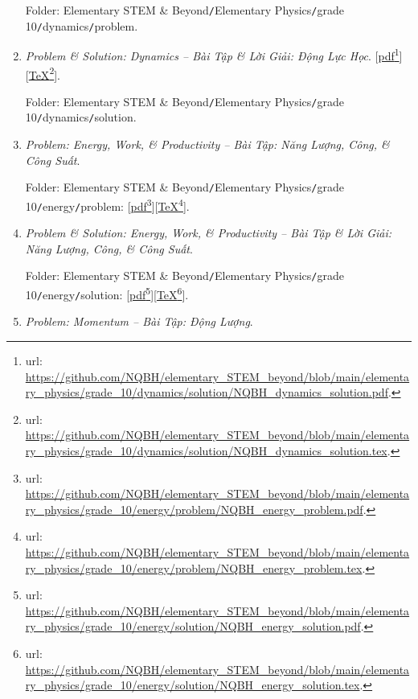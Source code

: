 \documentclass[12pt,twoside]{book}
\begin{document}
\begin{enumerate}
	Folder: {\sf Elementary STEM \& Beyond{\tt/}Elementary Physics{\tt/}grade 10{\tt/}dynamics{\tt/}problem}.
	
	\item {\it Problem \& Solution: Dynamics -- Bài Tập \& Lời Giải: Động Lực Học}. [\href{https://github.com/NQBH/elementary_STEM_beyond/blob/main/elementary_physics/grade_10/dynamics/solution/NQBH_dynamics_solution.pdf}{pdf}\footnote{{\sc url}: \url{https://github.com/NQBH/elementary_STEM_beyond/blob/main/elementary_physics/grade_10/dynamics/solution/NQBH_dynamics_solution.pdf}.}][\href{https://github.com/NQBH/elementary_STEM_beyond/blob/main/elementary_physics/grade_10/dynamics/solution/NQBH_dynamics_solution.tex}{\TeX}\footnote{{\sc url}: \url{https://github.com/NQBH/elementary_STEM_beyond/blob/main/elementary_physics/grade_10/dynamics/solution/NQBH_dynamics_solution.tex}.}].
	
	Folder: {\sf Elementary STEM \& Beyond{\tt/}Elementary Physics{\tt/}grade 10{\tt/}dynamics{\tt/}solution}.
	\item {\it Problem: Energy, Work, \it\& Productivity -- Bài Tập: Năng Lượng, Công, {\it\&} Công Suất}.
	
	Folder: {\sf Elementary STEM \& Beyond{\tt/}Elementary Physics{\tt/}grade 10{\tt/}energy{\tt/}problem}: [\href{https://github.com/NQBH/elementary_STEM_beyond/blob/main/elementary_physics/grade_10/energy/problem/NQBH_energy_problem.pdf}{pdf}\footnote{{\sc url}: \url{https://github.com/NQBH/elementary_STEM_beyond/blob/main/elementary_physics/grade_10/energy/problem/NQBH_energy_problem.pdf}.}][\href{https://github.com/NQBH/elementary_STEM_beyond/blob/main/elementary_physics/grade_10/energy/problem/NQBH_energy_problem.tex}{\TeX}\footnote{{\sc url}: \url{https://github.com/NQBH/elementary_STEM_beyond/blob/main/elementary_physics/grade_10/energy/problem/NQBH_energy_problem.tex}.}].
	
	\item {\it Problem \& Solution: Energy, Work, \it\& Productivity -- Bài Tập \& Lời Giải: Năng Lượng, Công, {\it\&} Công Suất}.
	
	Folder: {\sf Elementary STEM \& Beyond{\tt/}Elementary Physics{\tt/}grade 10{\tt/}energy{\tt/}solution}: [\href{https://github.com/NQBH/elementary_STEM_beyond/blob/main/elementary_physics/grade_10/energy/solution/NQBH_energy_solution.pdf}{pdf}\footnote{{\sc url}: \url{https://github.com/NQBH/elementary_STEM_beyond/blob/main/elementary_physics/grade_10/energy/solution/NQBH_energy_solution.pdf}.}][\href{https://github.com/NQBH/elementary_STEM_beyond/blob/main/eleomentummentary_physics/grade_10/energy/solution/NQBH_energy_solution.tex}{\TeX}\footnote{{\sc url}: \url{https://github.com/NQBH/elementary_STEM_beyond/blob/main/elementary_physics/grade_10/energy/solution/NQBH_energy_solution.tex}.}].
	\item {\it Problem: Momentum -- Bài Tập: Động Lượng}.
	

\end{enumerate}
\end{document}
